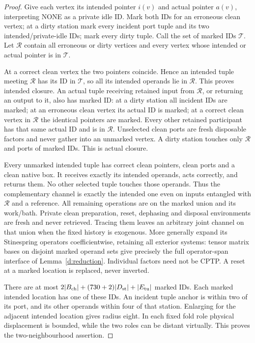 \begin{proof}
Give each vertex its intended pointer \(i(v)\) and actual pointer
\(a(v)\), interpreting NONE as a private idle ID. Mark both IDs for
an erroneous clean vertex; at a dirty station mark every incident port
tuple and its two intended/private-idle IDs; mark every dirty tuple.
Call the set of marked IDs \(\mathcal T\). Let \(\mathcal R\) contain
all erroneous or dirty vertices and every vertex whose intended or
actual pointer is in \(\mathcal T\).

At a correct clean vertex the two pointers coincide. Hence an intended
tuple meeting \(\mathcal R\) has its ID in \(\mathcal T\), so all its
intended operands lie in \(\mathcal R\). This proves intended closure.
An actual tuple receiving retained input from \(\mathcal R\), or
returning an output to it, also has marked ID: at a dirty station all
incident IDs are marked; at an erroneous clean vertex its actual ID is
marked; at a correct clean vertex in \(\mathcal R\) the identical
pointers are marked. Every other retained participant has that same
actual ID and is in \(\mathcal R\). Unselected clean ports are fresh
disposable factors and never gather into an unmarked vertex. A dirty
station touches only \(\mathcal R\) and ports of marked IDs. This is
actual closure.

Every unmarked intended tuple has correct clean pointers, clean ports
and a clean native box. It receives exactly its intended operands,
acts correctly, and returns them. No other selected tuple touches
those operands. Thus the complementary channel is exactly the intended
one even on inputs entangled with \(\mathcal R\) and a reference.
All remaining operations are on the marked union and its work/bath.
Private clean preparation, reset, dephasing and disposal environments
are fresh and never retrieved. Tracing them leaves an arbitrary joint
channel on that union when the fixed history is exogenous. More
generally expand its Stinespring operators coefficientwise, retaining
all exterior systems: tensor matrix bases on disjoint marked operand
sets give precisely the full operator-span interface of
Lemma~\ref{d:reduction}. Individual factors need not be CPTP.
A reset at a marked location is replaced, never inverted.

There are at most \(2|B_{\rm ch}|+(730+2)|D_{\rm st}|+|E_{\rm tu}|\)
marked IDs. Each marked intended location has one of these IDs.
An incident tuple anchor is within two of its port, and its other
operands within four of that station. Enlarging for the adjacent
intended location gives radius eight. In each fixed fold role physical
displacement is bounded, while the two roles can be distant virtually.
This proves the two-neighbourhood assertion.
\end{proof}

